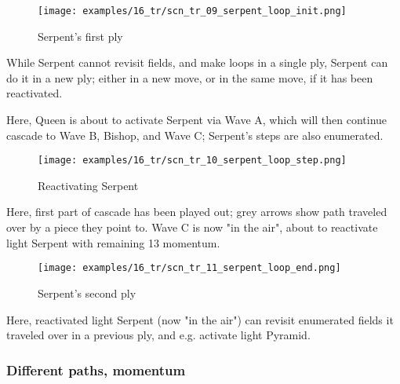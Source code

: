 \vspace*{-1.2\baselineskip}
\noindent
\begin{figure}[!h]
\texttt{[image: examples/16\_tr/scn\_tr\_09\_serpent\_loop\_init.png]}
\caption{Serpent's first ply}
\label{fig:scn_tr_09_serpent_loop_init}
\end{figure}

While Serpent cannot revisit fields, and make loops in a single ply, Serpent can
do it in a new ply; either in a new move, or in the same move, if it has been
reactivated.

Here, Queen is about to activate Serpent via Wave A, which will then continue
cascade to Wave B, Bishop, and Wave C; Serpent's steps are also enumerated.

\clearpage %

\vspace*{-2.1\baselineskip}
\noindent
\begin{figure}[!h]
\texttt{[image: examples/16\_tr/scn\_tr\_10\_serpent\_loop\_step.png]}
\caption{Reactivating Serpent}
\label{fig:scn_tr_10_serpent_loop_step}
\end{figure}

Here, first part of cascade has been played out; grey arrows show path traveled
over by a piece they point to. Wave C is now "in the air", about to reactivate
light Serpent with remaining 13 momentum.

\clearpage %

\vspace*{-2.1\baselineskip}
\noindent
\begin{figure}[!h]
\texttt{[image: examples/16\_tr/scn\_tr\_11\_serpent\_loop\_end.png]}
\caption{Serpent's second ply}
\label{fig:scn_tr_11_serpent_loop_end}
\end{figure}

Here, reactivated light Serpent (now "in the air") can revisit enumerated fields
it traveled over in a previous ply, and e.g. activate light Pyramid.

\clearpage %

\subsubsection*{Different paths, momentum}
\label{sec:Tamoanchan Revisited/Serpent/Movement/Different paths, momentum}

